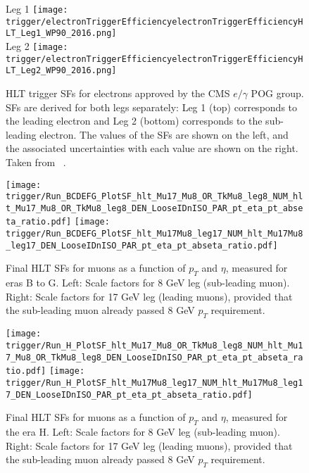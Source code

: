 \begin{figure}[H]
\centering
\subfloat Leg 1
{\texttt{[image: trigger/electronTriggerEfficiencyelectronTriggerEfficiencyHLT\_Leg1\_WP90\_2016.png]} } \\
\subfloat Leg 2
{\texttt{[image: trigger/electronTriggerEfficiencyelectronTriggerEfficiencyHLT\_Leg2\_WP90\_2016.png]} } \\
\caption[HLT trigger SFs for electrons.]{HLT trigger SFs for electrons approved by the CMS $e/ \gamma$ POG group.  SFs are derived for both legs separately: Leg 1 (top) corresponds to the leading electron and Leg 2 (bottom) corresponds to the sub-leading electron. The values of the SFs are shown on the left, and the associated uncertainties with each value are shown on the right. Taken from ~\cite{vhbbAN}.}
\label{fig:trigger_eff_diele}
\end{figure}

\begin{figure}[H]
\centering
\texttt{[image: trigger/Run\_BCDEFG\_PlotSF\_hlt\_Mu17\_Mu8\_OR\_TkMu8\_leg8\_NUM\_hlt\_Mu17\_Mu8\_OR\_TkMu8\_leg8\_DEN\_LooseIDnISO\_PAR\_pt\_eta\_pt\_abseta\_ratio.pdf]}
\texttt{[image: trigger/Run\_BCDEFG\_PlotSF\_hlt\_Mu17Mu8\_leg17\_NUM\_hlt\_Mu17Mu8\_leg17\_DEN\_LooseIDnISO\_PAR\_pt\_eta\_pt\_abseta\_ratio.pdf]}\\
\caption[Final HLT SFs for muons as a function of $p_{T}$ and $\eta$, measured for eras B to G.]{Final HLT SFs for muons as a function of $p_{T}$ and $\eta$, measured for eras B to G. Left: Scale factors for 8 GeV leg (sub-leading muon). Right: Scale factors for 17 GeV leg (leading muons), provided that the sub-leading muon already passed 8 GeV $p_T$ requirement.}
\label{fig:trigger_SF_dimu_BCDEFG}
\end{figure}

\begin{figure}[H]
\centering
\texttt{[image: trigger/Run\_H\_PlotSF\_hlt\_Mu17\_Mu8\_OR\_TkMu8\_leg8\_NUM\_hlt\_Mu17\_Mu8\_OR\_TkMu8\_leg8\_DEN\_LooseIDnISO\_PAR\_pt\_eta\_pt\_abseta\_ratio.pdf]}
\texttt{[image: trigger/Run\_H\_PlotSF\_hlt\_Mu17Mu8\_leg17\_NUM\_hlt\_Mu17Mu8\_leg17\_DEN\_LooseIDnISO\_PAR\_pt\_eta\_pt\_abseta\_ratio.pdf]}\\
\caption[Final HLT SFs for muons as a function of $p_{T}$ and $\eta$, measured for the era H.]{Final HLT SFs for muons as a function of $p_{T}$ and $\eta$, measured for the era H. Left: Scale factors for 8 GeV leg (sub-leading muon). Right: Scale factors for 17 GeV leg (leading muons), provided that the sub-leading muon already passed 8 GeV $p_T$ requirement.}
\label{fig:trigger_SF_dimu_H}
\end{figure}

